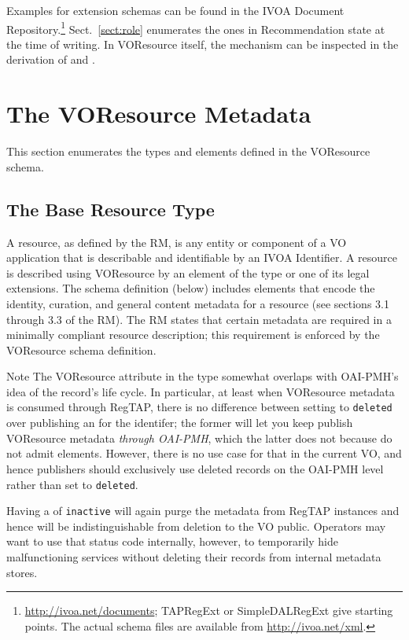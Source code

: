 \documentclass[11pt,a4paper]{ivoa}
\begin{document}
Examples for extension schemas can be found in the IVOA Document
Repository.\footnote{\url{http://ivoa.net/documents}; TAPRegExt or
SimpleDALRegExt give starting points.  The actual schema files are
available from \url{http://ivoa.net/xml}.}
Sect.~\ref{sect:role} enumerates the ones in Recommendation state at the
time of writing.  In VOResource itself, the mechanism can be inspected
in the derivation of  and .


\section{The VOResource Metadata}
\label{sect:metadata}


This section enumerates the types and elements defined in the
VOResource schema.


\subsection{The Base Resource Type}

\label{sect:restype}

A resource, as defined by the RM, is any entity or component of a VO
application that is describable and identifiable by an IVOA Identifier.
A resource is described using VOResource by an element of the type
 or one of its legal extensions.  The schema
definition (below) includes elements that encode the identity, curation,
and general content metadata for a resource (see sections 3.1 through
3.3 of the RM).  The RM states that certain metadata are required in a
minimally compliant resource description; this requirement is enforced
by the VOResource schema definition.

\begin{admonition}{Note}
The VOResource  attribute in the  type
somewhat overlaps with OAI-PMH's idea of the record's life cycle. In
particular, at least when VOResource metadata is consumed through
RegTAP, there is no difference between setting  to
\verb|deleted| over publishing an  for the
identifer; the former will let you keep publish VOResource metadata
\emph{through OAI-PMH}, which the latter does not because
 do not admit 
elements.  However, there is no use case for that in the current VO, and
hence publishers should exclusively use deleted records on the OAI-PMH
level rather than set  to \verb|deleted|.

Having a  of \verb|inactive| will again purge the metadata
from RegTAP instances and hence will be indistinguishable from deletion to
the VO public.  Operators may want to use that status code internally,
however, to temporarily hide malfunctioning services without deleting
their records from internal metadata stores.

\end{admonition}
\end{document}
